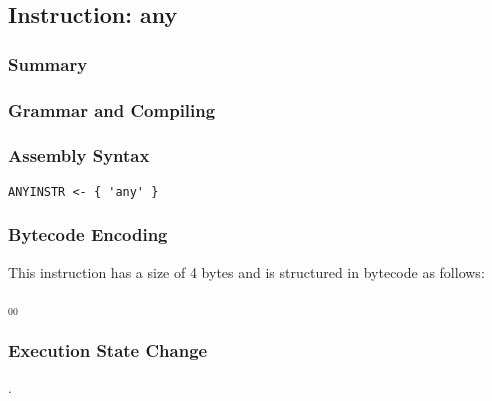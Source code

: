 \subsection{Instruction: any}

\subsubsection{Summary}


\subsubsection{Grammar and Compiling}


\subsubsection{Assembly Syntax}

\begin{myquote}
\begin{verbatim}
ANYINSTR <- { 'any' }
\end{verbatim}
\end{myquote}


\subsubsection{Bytecode Encoding}

This instruction has a size of 4 bytes and is structured in bytecode as follows:

$_{00}$\ 


\subsubsection{Execution State Change}

.


